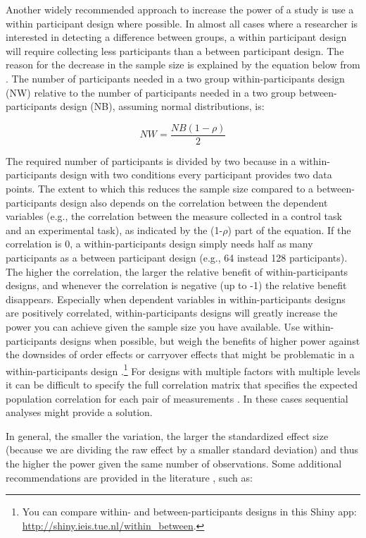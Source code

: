 \documentclass[
]{krantz}
\begin{document}
Another widely recommended approach to increase the power of a study is use a within participant design where possible. In almost all cases where a researcher is interested in detecting a difference between groups, a within participant design will require collecting less participants than a between participant design. The reason for the decrease in the sample size is explained by the equation below from \citet{maxwell_designing_2017}. The number of participants needed in a two group within-participants design (NW) relative to the number of participants needed in a two group between-participants design (NB), assuming normal distributions, is:

\[NW = \frac{NB (1-\rho)}{2}\]

The required number of participants is divided by two because in a within-participants design with two conditions every participant provides two data points. The extent to which this reduces the sample size compared to a between-participants design also depends on the correlation between the dependent variables (e.g., the correlation between the measure collected in a control task and an experimental task), as indicated by the (1-\(\rho\)) part of the equation. If the correlation is 0, a within-participants design simply needs half as many participants as a between participant design (e.g., 64 instead 128 participants). The higher the correlation, the larger the relative benefit of within-participants designs, and whenever the correlation is negative (up to -1) the relative benefit disappears. Especially when dependent variables in within-participants designs are positively correlated, within-participants designs will greatly increase the power you can achieve given the sample size you have available. Use within-participants designs when possible, but weigh the benefits of higher power against the downsides of order effects or carryover effects that might be problematic in a within-participants design \citep{maxwell_designing_2017}.\footnote{You can compare within- and between-participants designs in this Shiny app: \url{http://shiny.ieis.tue.nl/within_between}.} For designs with multiple factors with multiple levels it can be difficult to specify the full correlation matrix that specifies the expected population correlation for each pair of measurements \citep{lakens_simulation-based_2021}. In these cases sequential analyses might provide a solution.

In general, the smaller the variation, the larger the standardized effect size (because we are dividing the raw effect by a smaller standard deviation) and thus the higher the power given the same number of observations. Some additional recommendations are provided in the literature \citep{allison_power_1997, bausell_power_2002, hallahan_statistical_1996}, such as:
\end{document}
